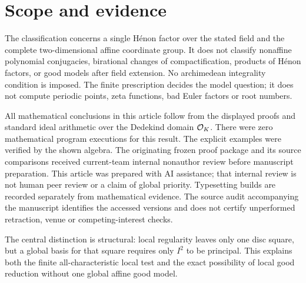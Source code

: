 \section{Scope and evidence}

The classification concerns a single H\'enon factor over the stated
field and the complete two-dimensional affine coordinate group.
It does not classify nonaffine polynomial conjugacies, birational
changes of compactification, products of H\'enon factors, or good
models after field extension. No archimedean integrality condition is
imposed. The finite prescription decides the model question; it does
not compute periodic points, zeta functions, bad Euler factors or
root numbers.

All mathematical conclusions in this article follow from the displayed
proofs and standard ideal arithmetic over the Dedekind domain
$\mathcal O_K$. There were zero mathematical program executions for this
result. The explicit examples were verified by the shown algebra.
The originating frozen proof package and its source comparisons
received current-team internal nonauthor review before manuscript
preparation. This article was prepared with AI assistance; that
internal review is not human peer review or a claim of global
priority. Typesetting builds are recorded separately from mathematical
evidence. The source audit accompanying the manuscript identifies
the accessed versions and does not certify unperformed retraction,
venue or competing-interest checks.

The central distinction is structural: local regularity leaves only
one disc square, but a global basis for that square requires only
$I^2$ to be principal. This explains both the finite all-characteristic
local test and the exact possibility of local good reduction without
one global affine good model.
